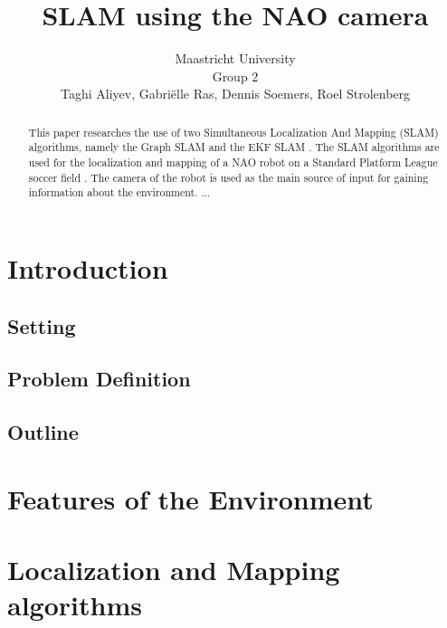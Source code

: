 \documentclass{ba-kecs}
\title{SLAM using the NAO camera}
\author{Maastricht University \\ Group 2 \\ Taghi Aliyev, Gabri\"elle Ras, Dennis Soemers, Roel Strolenberg}
\numberwithin{figure}{section}
\begin{document}
\maketitle


\begin{abstract}

This paper researches the use of two Simultaneous Localization And Mapping (SLAM) algorithms, namely the Graph SLAM \cite{Cd1} and the EKF SLAM \cite{Cd2}. The SLAM algorithms are used for the localization and mapping of a NAO robot on a Standard Platform League soccer field \cite{Cd3}. The camera of the robot is used as the main source of input for gaining information about the environment.
...

\end{abstract}


\section{Introduction}


\subsection{Setting}



\subsection{Problem Definition}


\subsection{Outline}



\section{Features of the Environment}


\section{Localization and Mapping algorithms}
\end{document}
